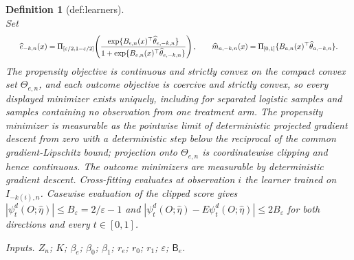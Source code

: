 \documentclass{article}
\newtheorem{definition}{Definition}
\begin{document}
\begin{definition}[def:learners]
\[\]
Set
\[
\makebox[\linewidth][c]{\resizebox{0.98\linewidth}{!}{\par\noindent \makebox[\linewidth][c]{\resizebox{0.98\linewidth}{!}{\(\displaystyle \displaystyle \widehat e_{-k,n}(x)=\Pi_{[\varepsilon/2,1-\varepsilon/2]}\!\left(\frac{\exp\{B_{e,n}(x)^\top\widehat\theta_{e,-k,n}\}}{1+\exp\{B_{e,n}(x)^\top\widehat\theta_{e,-k,n}\}}\right),\qquad \widehat m_{a,-k,n}(x)=\Pi_{[0,1]}\{B_{a,n}(x)^\top\widehat\theta_{a,-k,n}\}.\)}}\par\noindent}}
\]
The propensity objective is continuous and strictly convex on the compact convex set \(\Theta_{e,n}\), and each outcome objective is coercive and strictly convex, so every displayed minimizer exists uniquely, including for separated logistic samples and samples containing no observation from one treatment arm. The propensity minimizer is measurable as the pointwise limit of deterministic projected gradient descent from zero with a deterministic step below the reciprocal of the common gradient-Lipschitz bound; projection onto \(\Theta_{e,n}\) is coordinatewise clipping and hence continuous. The outcome minimizers are measurable by deterministic gradient descent. Cross-fitting evaluates at observation \(i\) the learner trained on \(I_{-k(i),n}\). Casewise evaluation of the clipped score gives \(|\psi_t^d(O;\widehat\eta)|\le B_\varepsilon=2/\varepsilon-1\) and \(|\psi_t^d(O;\widehat\eta)-E\psi_t^d(O;\widehat\eta)|\le2B_\varepsilon\) for both directions and every \(t\in[0,1]\).
\par\smallskip\noindent\emph{Inputs.} \(Z_n\); \(K\); \(\beta_e\); \(\beta_0\); \(\beta_1\); \(r_e\); \(r_0\); \(r_1\); \(\varepsilon\); \(\mathsf B_e\).
\end{definition}
\end{document}
